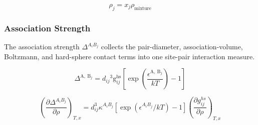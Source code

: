 \documentclass[12pt, letterpaper]{article}
\begin{document}
\begin{equation}
    \rho_{j}=x_{j}\rho_{\mathrm{mixture}}
    \label{eq:rho_j_assoc}
\end{equation}

\subsubsection{Association Strength}

The association strength \(\Delta^{A_iB_j}\) collects the pair-diameter, association-volume, Boltzmann, and hard-sphere contact terms into one site-pair interaction measure.

\begin{equation}
    \Delta^{\mathrm{A}, \mathrm{~B}_{j}}=d_{i j}{ }^3 \mathrm{g}_{i j}^{\mathrm{hs}}\left[\exp \left(\frac{\epsilon^{\mathrm{A}, \mathrm{~B}_{j}}}{k T}\right)-1\right]
    \label{eq:delta_assoc}
\end{equation}


\begin{equation}
    \left(\frac{\partial\Delta^{A_{i}B_{j}}}{\partial\rho}\right)_{T,x}=d_{ij}^3\kappa^{A_{i}B_{j}}\left[\exp(\epsilon^{A_{i}B_{j}}/kT)-1\right]\left(\frac{\partial g_{ij}^{hs}}{\partial\rho}\right)_{T,x}
    \label{eq:ddelta_assoc_drho}
\end{equation}

\end{document}
